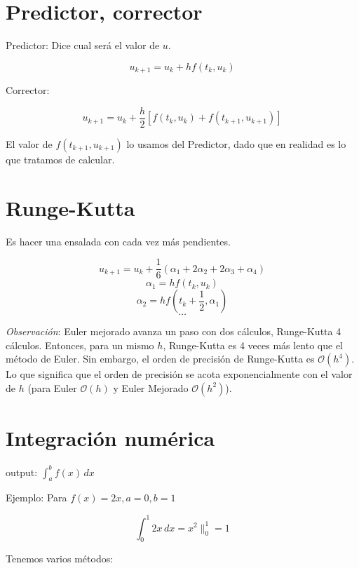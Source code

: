 \section{Predictor, corrector}

Predictor: Dice cual ser\'a el valor de $u$.

$$u_{k+1} = u_k + h f(t_k, u_k)$$

Corrector:

$$u_{k+1} = u_k + \frac{h}{2} \left[f(t_k, u_k) + f(t_{k+1}, u_{k+1})\right]$$

El valor de $f(t_{k+1}, u_{k+1})$ lo usamos del Predictor, dado que en realidad es lo que tratamos de calcular.


\section{Runge-Kutta}

Es hacer una ensalada con cada vez m\'as pendientes.

$$u_{k+1} = u_k + \frac{1}{6}(\alpha_1 + 2\alpha_2 + 2\alpha_3 + \alpha_4)$$
$$ \alpha_1 = h f(t_k, u_k) $$
$$ \alpha_2 = h f(t_k + \frac{1}{2}, \alpha_1) $$
$$ \dotsc $$

\emph{Observaci\'on}: Euler mejorado avanza un paso con dos c\'alculos, Runge-Kutta 4 c\'alculos. Entonces, para un mismo $h$, Runge-Kutta es 4 veces m\'as lento que el m\'etodo de Euler. Sin embargo, el orden de precisi\'on de Runge-Kutta es $\mathcal{O}(h^4)$. Lo que significa que el orden de precisi\'on se acota exponencialmente con el valor de $h$ (para Euler $\mathcal{O}(h)$ y Euler Mejorado $\mathcal{O}(h^2)$).



\section{Integraci\'on num\'erica}



output: $ \int_a^b\! f(x) \, dx $

Ejemplo: Para $f(x) = 2x, a = 0, b = 1$


$$ \int_0^1\! 2x \, dx = x^2\|^1_0 = 1$$

Tenemos varios m\'etodos:

